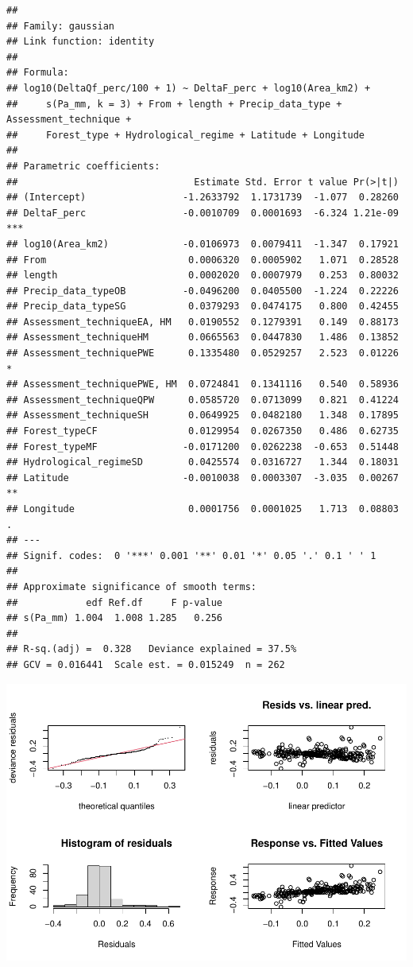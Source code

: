 \documentclass[]{elsarticle} %
\begin{document}
\begin{verbatim}
## 
## Family: gaussian 
## Link function: identity 
## 
## Formula:
## log10(DeltaQf_perc/100 + 1) ~ DeltaF_perc + log10(Area_km2) + 
##     s(Pa_mm, k = 3) + From + length + Precip_data_type + Assessment_technique + 
##     Forest_type + Hydrological_regime + Latitude + Longitude
## 
## Parametric coefficients:
##                               Estimate Std. Error t value Pr(>|t|)    
## (Intercept)                 -1.2633792  1.1731739  -1.077  0.28260    
## DeltaF_perc                 -0.0010709  0.0001693  -6.324 1.21e-09 ***
## log10(Area_km2)             -0.0106973  0.0079411  -1.347  0.17921    
## From                         0.0006320  0.0005902   1.071  0.28528    
## length                       0.0002020  0.0007979   0.253  0.80032    
## Precip_data_typeOB          -0.0496200  0.0405500  -1.224  0.22226    
## Precip_data_typeSG           0.0379293  0.0474175   0.800  0.42455    
## Assessment_techniqueEA, HM   0.0190552  0.1279391   0.149  0.88173    
## Assessment_techniqueHM       0.0665563  0.0447830   1.486  0.13852    
## Assessment_techniquePWE      0.1335480  0.0529257   2.523  0.01226 *  
## Assessment_techniquePWE, HM  0.0724841  0.1341116   0.540  0.58936    
## Assessment_techniqueQPW      0.0585720  0.0713099   0.821  0.41224    
## Assessment_techniqueSH       0.0649925  0.0482180   1.348  0.17895    
## Forest_typeCF                0.0129954  0.0267350   0.486  0.62735    
## Forest_typeMF               -0.0171200  0.0262238  -0.653  0.51448    
## Hydrological_regimeSD        0.0425574  0.0316727   1.344  0.18031    
## Latitude                    -0.0010038  0.0003307  -3.035  0.00267 ** 
## Longitude                    0.0001756  0.0001025   1.713  0.08803 .  
## ---
## Signif. codes:  0 '***' 0.001 '**' 0.01 '*' 0.05 '.' 0.1 ' ' 1
## 
## Approximate significance of smooth terms:
##            edf Ref.df     F p-value
## s(Pa_mm) 1.004  1.008 1.285   0.256
## 
## R-sq.(adj) =  0.328   Deviance explained = 37.5%
## GCV = 0.016441  Scale est. = 0.015249  n = 262
\end{verbatim}

\includegraphics{Forest_and_Water_files/figure-latex/model2d-1.pdf}
\end{document}
